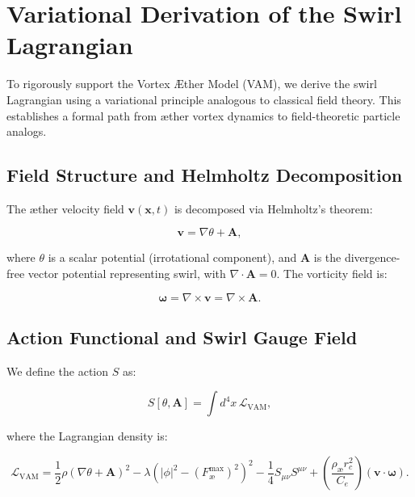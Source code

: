 \section{Variational Derivation of the Swirl Lagrangian}

To rigorously support the Vortex \AE{}ther Model (VAM), we derive the swirl Lagrangian using a variational principle analogous to classical field theory. This establishes a formal path from \ae{}ther vortex dynamics to field-theoretic particle analogs.

\subsection{Field Structure and Helmholtz Decomposition}

The \ae{}ther velocity field $\mathbf{v}(\mathbf{x}, t)$ is decomposed via Helmholtz's theorem:

\begin{equation}
\mathbf{v} = \nabla \theta + \mathbf{A},
\end{equation}

where $\theta$ is a scalar potential (irrotational component), and $\mathbf{A}$ is the divergence-free vector potential representing swirl, with $\nabla \cdot \mathbf{A} = 0$. The vorticity field is:

\begin{equation}
\boldsymbol{\omega} = \nabla \times \mathbf{v} = \nabla \times \mathbf{A}.
\end{equation}

\subsection{Action Functional and Swirl Gauge Field}

We define the action $S$ as:

\begin{equation}
S[\theta, \mathbf{A}] = \int d^4x \, \mathcal{L}_{\text{VAM}},
\end{equation}

where the Lagrangian density is:

\begin{equation}
\mathcal{L}_{\text{VAM}} = \frac{1}{2} \rho (\nabla \theta + \mathbf{A})^2 - \lambda (|\phi|^2 - (F^{\text{max}}_{\text{\ae}})^2)^2 - \frac{1}{4} S_{\mu\nu} S^{\mu\nu} + \left( \frac{\rho_{\text{\ae}} r_c^2}{C_e} \right) (\mathbf{v} \cdot \boldsymbol{\omega}).
\end{equation}

